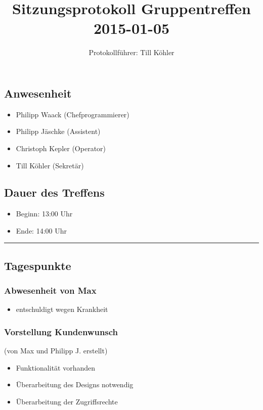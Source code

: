 \documentclass[12pt,a4paper]{article}
\author{Protokollführer: Till Köhler}
\title{Sitzungsprotokoll Gruppentreffen 2015-01-05}
\date{}
\begin{document}
\maketitle

\subsection*{Anwesenheit}
\medskip
\begin{itemize}
\item Philipp Waack (Chefprogrammierer)
\item Philipp Jäschke (Assistent)
\item Christoph Kepler (Operator)
\item Till Köhler (Sekretär)
\end{itemize}

\subsection*{Dauer des Treffens}
\medskip
\begin{itemize}
\item Beginn: 13:00 Uhr
\item Ende: 14:00 Uhr
\end{itemize}

\noindent\rule{\textwidth}{1pt}

\subsection*{Tagespunkte}
\medskip

\subsubsection*{Abwesenheit von Max}
\begin{itemize}
\item entschuldigt wegen Krankheit
\end{itemize}

\subsubsection*{Vorstellung Kundenwunsch}
(von Max und Philipp J. erstellt)
\begin{itemize}
\item Funktionalität vorhanden
\item Überarbeitung des Designs notwendig
\item Überarbeitung der Zugriffsrechte
\end{itemize}
\end{document}
